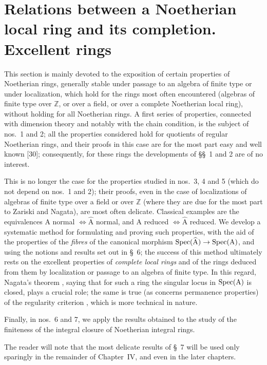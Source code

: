 \section{Relations between a Noetherian local ring and its completion. Excellent rings}
\label{section:IV.7}

This section is mainly devoted to the exposition of certain properties of
Noetherian rings, generally stable under passage to an algebra of finite type
or under localization, which hold for the rings most often encountered
(algebras of finite type over $\mathbb Z$, or over a field, or over a complete
Noetherian local ring), without holding for all Noetherian rings. A first
series of properties, connected with dimension theory and notably with the
chain condition, is the subject of nos.~1 and 2; all the properties considered
hold for quotients of regular Noetherian rings, and their proofs in this case
are for the most part easy and well known [30]; consequently, for these rings
the developments of \S\S~1 and 2 are of no interest.

This is no longer the case for the properties studied in nos.~3, 4 and 5
(which do not depend on nos.~1 and 2); their proofs, even in the case of
localizations of algebras of finite type over a field or over $\mathbb Z$
(where they are due for the most part to Zariski and Nagata), are most often
delicate. Classical examples are the equivalences
$\mathrm{A}$ normal $\Longleftrightarrow\widehat{\mathrm{A}}$ normal, and
$\mathrm{A}$ reduced $\Longleftrightarrow\widehat{\mathrm{A}}$ reduced. We
develop a systematic method for formulating and proving such properties, with
the aid of the properties of the \emph{fibres} of the canonical morphism
$\operatorname{Spec}(\widehat{\mathrm{A}})\to\operatorname{Spec}(\mathrm{A})$, and using the notions and
results set out in \S~6; the success of this method ultimately rests on the
excellent properties of \emph{complete local rings} and of the rings deduced
from them by localization or passage to an algebra of finite type. In this
regard, Nagata's theorem , saying that for such a ring the
singular locus in $\operatorname{Spec}(\mathrm{A})$ is closed, plays a crucial role; the same
is true (as concerns permanence properties) of the regularity criterion
, which is more technical in nature.

Finally, in nos.~6 and 7, we apply the results obtained to the study of the
finiteness of the integral closure of Noetherian integral rings.

The reader will note that the most delicate results of \S~7 will be used only
sparingly in the remainder of Chapter~IV, and even in the later chapters.


